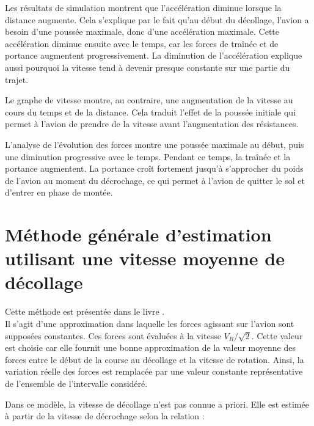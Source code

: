 			Les résultats de simulation montrent que l’accélération diminue lorsque la distance augmente. 
			Cela s’explique par le fait qu’au début du décollage, l’avion a besoin d’une poussée maximale,
			 donc d’une accélération maximale. Cette accélération diminue ensuite avec le temps, car les 
			 forces de traînée et de portance augmentent progressivement. La diminution de l’accélération 
			 explique aussi pourquoi la vitesse tend à devenir presque constante sur une partie du trajet.
			
			Le graphe de vitesse montre, au contraire, une augmentation de la vitesse au cours du temps
			 et de la distance. Cela traduit l’effet de la poussée initiale qui permet à l’avion de prendre
			  de la vitesse avant l’augmentation des résistances.
			
			L’analyse de l’évolution des forces montre une poussée maximale au début, puis une diminution
			 progressive avec le temps. Pendant ce temps, la traînée et la portance augmentent.
			  La portance croît fortement jusqu’à s’approcher du poids de l’avion au moment du 
			  décrochage, ce qui permet à l’avion de quitter le sol et d’entrer en phase de montée.
			  
			  
			
		
			
		
		



%
		\section{ Méthode générale d’estimation utilisant une vitesse moyenne de décollage } 
		Cette méthode est présentée dans le livre \cite{smi:60}.\\
		
		Il s'agit d'une approximation dans laquelle les forces agissant sur l'avion sont supposées constantes. Ces forces sont évaluées à la vitesse $V_R/\sqrt{2}$. Cette valeur est choisie car elle fournit une bonne approximation de la valeur moyenne des forces entre le début de la course au décollage et la vitesse de rotation. Ainsi, la variation réelle des forces est remplacée par une valeur constante représentative de l'ensemble de l'intervalle considéré.

		Dans ce modèle, la vitesse de décollage n'est pas connue a priori. Elle est estimée à partir de la vitesse de décrochage selon la relation :
		
